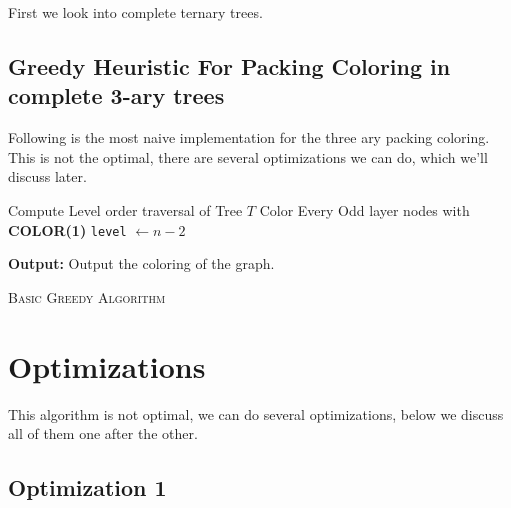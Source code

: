 \documentclass{article}
\theoremstyle{remark}
\begin{document}
First we look into complete ternary trees.

\subsection{Greedy Heuristic For Packing Coloring in complete 3-ary trees}
Following is the most naive implementation for the three ary packing coloring.
This is not the optimal, there are several optimizations we can do,
which we'll discuss later.

\begin{algorithm}[H]\label{alg:1}

    \BlankLine
    Compute Level order traversal of Tree $T$\;
    Color Every Odd layer nodes with \textbf{COLOR(1)}\;
    \texttt{level} $\gets n - 2$\;

    \textbf{Output:} Output the coloring of the graph.

    \caption{\textsc{Basic Greedy Algorithm}}
\end{algorithm}

\section{Optimizations}
This algorithm is not optimal, we can do several optimizations, below
we discuss all of them one after the other.

\subsection{Optimization 1}
\end{document}
